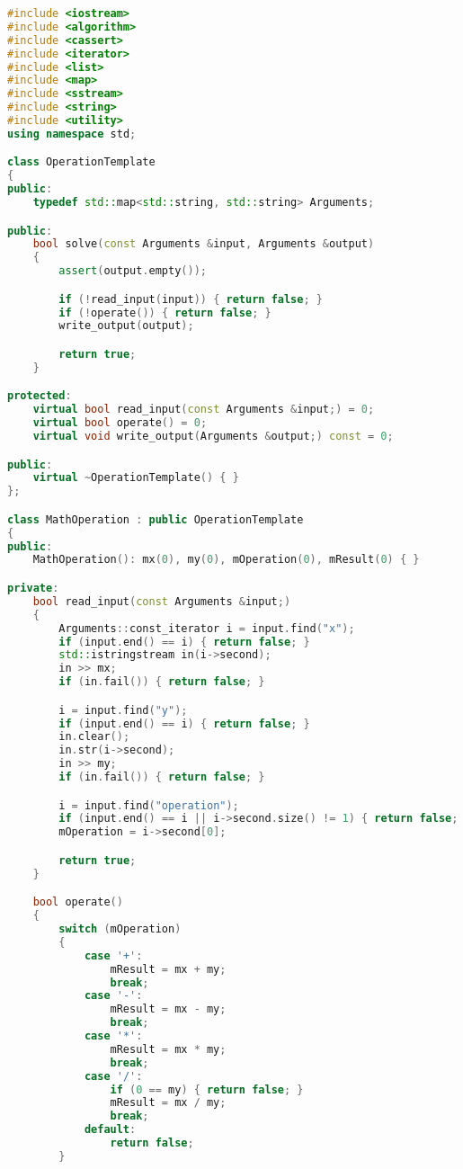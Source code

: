 \documentclass{book}
\begin{document}
\begin{lstlisting}[caption={Template Method Pattern Sample 2}, language=C++]
#include <iostream>
#include <algorithm>
#include <cassert>
#include <iterator>
#include <list>
#include <map>
#include <sstream>
#include <string>
#include <utility>
using namespace std;

class OperationTemplate
{
public:
    typedef std::map<std::string, std::string> Arguments;

public:
    bool solve(const Arguments &input, Arguments &output)
    {
        assert(output.empty());

        if (!read_input(input)) { return false; }
        if (!operate()) { return false; }
        write_output(output);

        return true;
    }

protected:
    virtual bool read_input(const Arguments &input;) = 0;
    virtual bool operate() = 0;
    virtual void write_output(Arguments &output;) const = 0;

public:
    virtual ~OperationTemplate() { }
};

class MathOperation : public OperationTemplate
{
public:
    MathOperation(): mx(0), my(0), mOperation(0), mResult(0) { }

private:
    bool read_input(const Arguments &input;)
    {
        Arguments::const_iterator i = input.find("x");
        if (input.end() == i) { return false; }
        std::istringstream in(i->second);
        in >> mx;
        if (in.fail()) { return false; }

        i = input.find("y");
        if (input.end() == i) { return false; }
        in.clear();
        in.str(i->second);
        in >> my;
        if (in.fail()) { return false; }

        i = input.find("operation");
        if (input.end() == i || i->second.size() != 1) { return false; }
        mOperation = i->second[0];

        return true;
    }

    bool operate()
    {
        switch (mOperation)
        {
            case '+':
                mResult = mx + my;
                break;
            case '-':
                mResult = mx - my;
                break;
            case '*':
                mResult = mx * my;
                break;
            case '/':
                if (0 == my) { return false; }
                mResult = mx / my;
                break;
            default:
                return false;
        }


\end{lstlisting}
\end{document}
